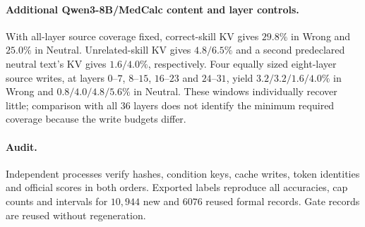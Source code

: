 \paragraph{Additional Qwen3-8B/MedCalc content and layer controls.}
With all-layer source coverage fixed, correct-skill KV gives
$29.8\%$ in Wrong and $25.0\%$ in Neutral. Unrelated-skill KV gives
$4.8/6.5\%$ and a second predeclared neutral text's KV gives
$1.6/4.0\%$, respectively. Four equally sized eight-layer source writes, at layers
$0$--$7$, $8$--$15$, $16$--$23$ and $24$--$31$, yield
$3.2/3.2/1.6/4.0\%$ in Wrong and $0.8/4.0/4.8/5.6\%$ in Neutral.
These windows individually recover little; comparison with all $36$
layers does not identify the minimum required coverage because the write
budgets differ.


\paragraph{Audit.}
Independent processes verify hashes, condition keys, cache writes, token
identities and official scores in both orders. Exported labels reproduce
all accuracies, cap counts and intervals for $10{,}944$ new and $6076$
reused formal records. Gate records are reused without regeneration.
